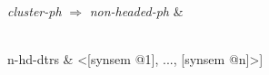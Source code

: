 \documentclass[varwidth]{standalone}
\begin{document}
\textit{cluster-ph} $\Rightarrow$ \textit{non-headed-ph} \& \\
\begin{avm}
[head & [\tp{head}\\
				 cluster & nelist\(synsem\) <@{1}, ..., @{n}>]\\
 n-hd-dtrs & <[synsem @{1}], ..., [synsem @{n}]>]
 
\end{avm}\\
\end{document}
